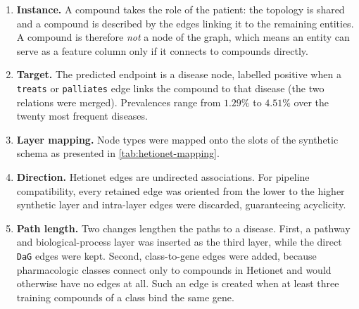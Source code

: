 \begin{enumerate}[label=(\roman*)]
  \item \textbf{Instance.} A compound takes the role of the patient: the
    topology is shared and a compound is described by the edges linking it to
    the remaining entities. A compound is therefore \emph{not} a node of the
    graph, which means an entity can serve as a feature column only if it
    connects to compounds directly.

  \item \textbf{Target.} The predicted endpoint is a disease node, labelled positive when a
  \texttt{treats} or \texttt{palliates} edge links the compound to that disease
  (the two relations were merged).
  Prevalences range from $1.29\%$ to $4.51\%$ over the twenty most frequent
  diseases. 

  \item \textbf{Layer mapping.} Node types were mapped onto the slots of the
    synthetic schema as presented in \cref{tab:hetionet-mapping}.

  \item \textbf{Direction.} Hetionet edges are undirected associations.
    For pipeline compatibility, every retained edge was oriented from the
    lower to the higher synthetic layer and intra-layer edges were
    discarded, guaranteeing acyclicity. 

  \item \textbf{Path length.} Two changes lengthen the paths to a disease. First, a pathway and
  biological-process layer was inserted as the third layer, while the direct
  \texttt{DaG} edges were kept. Second, class-to-gene edges were added, because
  pharmacologic classes connect only to compounds in Hetionet and would otherwise
  have no edges at all. Such an edge is created when at least three training
  compounds of a class bind the same gene.

\end{enumerate}

